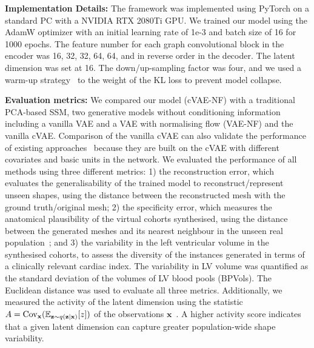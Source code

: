 \documentclass[runningheads]{llncs}
\begin{document}
\textbf{Implementation Details:} The framework was implemented using PyTorch on a standard PC with a NVIDIA RTX 2080Ti GPU. We trained our model using the AdamW optimizer with an initial learning rate of 1e-3 and batch size of 16 for 1000 epochs. The feature number for each graph convolutional block in the encoder was 16, 32, 32, 64, 64, and in reverse order in the decoder. The latent dimension was set at 16. The down/up-sampling factor was four, and we used a warm-up strategy~\cite{sonderby2016ladder} to the weight of the KL loss to prevent model collapse.

\textbf{Evaluation metrics:} We compared our model (cVAE-NF) with a traditional PCA-based SSM, two generative models without conditioning information including a vanilla VAE and a VAE with normalising flow (VAE-NF) and the vanilla cVAE. Comparison of the vanilla cVAE can also validate the performance of existing approaches~\cite{beetz2022generating,beetz2022multi} because they are built on the cVAE with different covariates and basic units in the network. We evaluated the performance of all methods using three different metrics: 1) the reconstruction error, which evaluates the generalisability of the trained model to reconstruct/represent unseen shapes, using the distance between the reconstructed mesh with the ground truth/original mesh; 2) the specificity error, which measures the anatomical plausibility of the virtual cohorts synthesised, using the distance between the generated meshes and its nearest neighbour in the unseen real population~\cite{davies2009building}; and 3) the variability in the left ventricular volume in the synthesised cohorts, to assess the diversity of the instances generated in terms of a clinically relevant cardiac index. The variability in LV volume was quantified as the standard deviation of the volumes of LV blood pools (BPVols). The Euclidean distance was used to evaluate all three metrics. Additionally, we measured the activity of the latent dimension using the statistic $A = {\rm Cov}_{\textbf{x}}(\mathbb{E}_{\textbf{z}\sim q(\textbf{z} \vert \textbf{x})} [z])$ of the observations $\textbf{x}$~\cite{burda2015importance}. A higher activity score indicates that a given latent dimension can capture greater population-wide shape variability.
\end{document}
